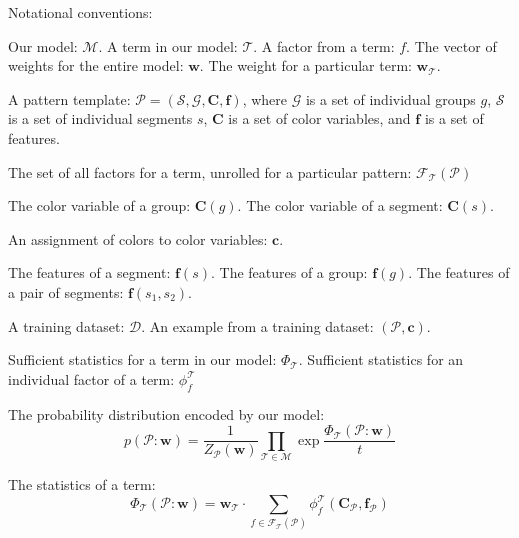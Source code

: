 
\newcommand{\pattern}{\mathcal{P}}
\newcommand{\group}{g}
\newcommand{\groups}{\mathcal{G}}
\newcommand{\segment}{s}
\newcommand{\segments}{\mathcal{S}}
\newcommand{\model}{\mathcal{M}}
\newcommand{\term}{\mathcal{T}}
\newcommand{\factor}{f}
\newcommand{\factors}{\mathcal{F}_\term}
\newcommand{\weights}{\mathbf{w}}
\newcommand{\dataset}{\mathcal{D}}
\newcommand{\variable}[1]{\mathbf{#1}}
\newcommand{\colorVars}{\variable{C}}
\newcommand{\colors}{\variable{c}}
\newcommand{\features}{\variable{f}}
\newcommand{\termStats}{\Phi_\term}
\newcommand{\factorStats}{\phi^\term_\factor}
\newcommand{\expectation}{\mathds{E}}

Notational conventions:

Our model: $\model$. A term in our model: $\term$. A factor from a term: $\factor$. The vector of weights for the entire model: $\weights$. The weight for a particular term: $\weights_\term$.

A pattern template: $\pattern = (\segments, \groups, \colorVars, \features)$, where $\groups$ is a set of individual groups $\group$, $\segments$ is a set of individual segments $\segment$, $\colorVars$ is a set of color variables, and $\features$ is a set of features.

The set of all factors for a term, unrolled for a particular pattern: $\factors(\pattern)$

The color variable of a group: $\colorVars(\group)$. The color variable of a segment: $\colorVars(\segment)$.

An assignment of colors to color variables: $\colors$.

The features of a segment: $\features(\segment)$. The features of a group: $\features(\group)$. The features of a pair of segments: $\features(\segment_1, \segment_2)$.

A training dataset: $\dataset$. An example from a training dataset: $(\pattern, \colors)$.

Sufficient statistics for a term in our model: $\termStats$. Sufficient statistics for an individual factor of a term: $\factorStats$

The probability distribution encoded by our model:
\begin{equation*}
p(\pattern : \weights) = \frac{1}{Z_\pattern(\weights)} \prod_{\term \in \model} \exp{\frac{\termStats(\pattern : \weights)}{t}}
\end{equation*}

The statistics of a term:
\begin{equation*}
\termStats(\pattern : \weights) = \weights_\term \cdot \sum_{\factor \in \factors(\pattern)} \factorStats(\colorVars_\pattern, \features_\pattern)
\end{equation*}